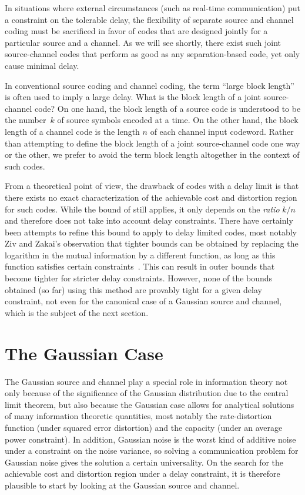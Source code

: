 In situations where external circumstances (such as real-time communication) put
a constraint on the tolerable delay, the flexibility of separate source and
channel coding must be sacrificed in favor of codes that are designed jointly
for a particular source and a channel. As we will see shortly, there exist such
joint source-channel codes that perform as good as any separation-based code,
yet only cause minimal delay.

\begin{remark}
  \label{rem:blocklength}
  In conventional source coding and channel coding, the term ``large block
  length'' is often used to imply a large delay. What is the block length of a
  joint source-channel code? On one hand, the block length of a source code is
  understood to be the number~$k$ of source symbols encoded at a time. On the
  other hand, the block length of a channel code is the length $n$ of each
  channel input codeword. Rather than attempting to define the block length of a
  joint source-channel code one way or the other, we prefer to avoid the term
  block length altogether in the context of such codes. 
\end{remark}

From a theoretical point of view, the drawback of codes with a delay limit is
that there exists no exact characterization of the achievable cost and
distortion region for such codes. While the bound of 
still applies, it only depends on the \emph{ratio} $k/n$ and therefore does not
take into account delay constraints. There have certainly been attempts to
refine this bound to apply to delay limited codes, most notably Ziv and Zakai's
observation that tighter bounds can be obtained by replacing the logarithm in
the mutual information by a different function, as long as this function
satisfies certain constraints~\cite{ZivZ1973}. This can result in outer bounds
that become tighter for stricter delay constraints. However, none of the bounds
obtained (so far) using this method are provably tight for a given delay
constraint, not even for the canonical case of a Gaussian source and channel,
which is the subject of the next section.


\section{The Gaussian Case}

The Gaussian source and channel play a special role in information theory not
only because of the significance of the Gaussian distribution due to the central
limit theorem, but also because the Gaussian case allows for analytical
solutions of many information theoretic quantities, most notably the
rate-distortion function (under squared error distortion) and the capacity
(under an average power constraint). In addition, Gaussian noise is the worst
kind of additive noise under a constraint on the noise variance, so solving a
communication problem for Gaussian noise gives the solution a certain
universality. On the search for the achievable cost and distortion region under
a delay constraint, it is therefore plausible to start by looking at the
Gaussian source and channel. 

